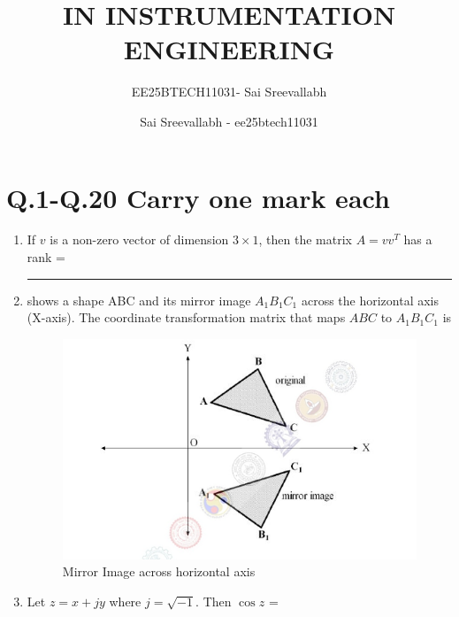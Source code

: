 \documentclass[journal,12pt,onecolumn]{IEEEtran}
\title{IN  INSTRUMENTATION ENGINEERING}
\author{EE25BTECH11031- Sai Sreevallabh}
\author{Sai Sreevallabh - ee25btech11031}
\theoremstyle{remark}
\begin{document}
\maketitle
\section*{\textbf{Q.1-Q.20 Carry one mark each}} 

\begin{enumerate}
\item If $v$ is a non-zero vector of dimension $3\times 1$, then the matrix
$A = vv^T$ has a rank = \rule{1.5cm}{0.4pt} \par \hfill{}


\item {} shows a shape ABC and its mirror image $A_1B_1C_1$ across the horizontal axis (X-axis). 
The coordinate transformation matrix that maps $ABC$ to $A_1B_1C_1$ is 
\begin{figure}[H]
    \centering
    \includegraphics[width=0.5\columnwidth]{Figs/Q-2.png}
    \caption{Mirror Image across horizontal axis}
    \label{fig:placeholder_1}
\end{figure}
\par \hfill{}
\begin{enumerate}
\end{enumerate}

\item Let $z=x+j y$ where $j = \sqrt{-1}$. Then $\cos z$ =\par \hfill{}
\begin{enumerate}
\end{enumerate}


\end{enumerate}
\end{document}
